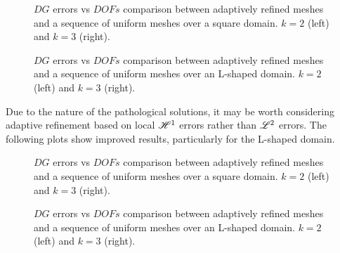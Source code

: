 \begin{figure}[!ht]
	\begin{subfigure}[b]{0.45\textwidth}
		
	\end{subfigure}
	\hfill
	\begin{subfigure}[b]{0.45\textwidth}
		
	\end{subfigure}
    \caption{$DG$ errors vs $DOFs$ comparison between adaptively refined meshes and a sequence of uniform meshes over a square domain. $k = 2$ (left) and $k = 3$ (right).}
\end{figure}

\begin{figure}[!ht]
	\begin{subfigure}[b]{0.45\textwidth}
		
	\end{subfigure}
	\hfill
	\begin{subfigure}[b]{0.45\textwidth}
		
	\end{subfigure}
    \caption{$DG$ errors vs $DOFs$ comparison between adaptively refined meshes and a sequence of uniform meshes over an L-shaped domain. $k = 2$ (left) and $k = 3$ (right).}
\end{figure}

\newpage

Due to the nature of the pathological solutions, it may be worth considering adaptive refinement based on local $\mathscr{H}^1$ errors rather than $\mathscr{L}^2$ errors. The following plots show improved results, particularly for the L-shaped domain.

\begin{figure}[!ht]
	\begin{subfigure}[b]{0.45\textwidth}
		
	\end{subfigure}
	\hfill
	\begin{subfigure}[b]{0.45\textwidth}
		
	\end{subfigure}
    \caption{$DG$ errors vs $DOFs$ comparison between adaptively refined meshes and a sequence of uniform meshes over a square domain. $k = 2$ (left) and $k = 3$ (right).}
\end{figure}

\begin{figure}[!ht]
	\begin{subfigure}[b]{0.45\textwidth}
		
	\end{subfigure}
	\hfill
	\begin{subfigure}[b]{0.45\textwidth}
	\end{subfigure}
    \caption{$DG$ errors vs $DOFs$ comparison between adaptively refined meshes and a sequence of uniform meshes over an L-shaped domain. $k = 2$ (left) and $k = 3$ (right).}
\end{figure}

